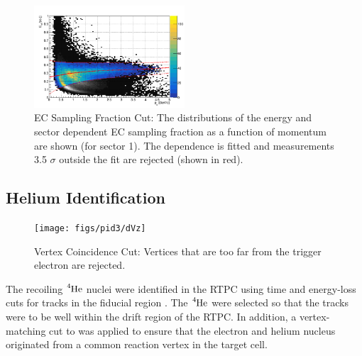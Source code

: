 \documentclass[10pt,prd,aps,showpacs,twocolumn,unsortedaddress]{revtex4-1}
\newcommand\he{{\ce{^{4}He}}}
\begin{document}
        \begin{figure}[h!]
          \centering
          \captionsetup{width=\linewidth, format=hang}
            \includegraphics[width=0.5\textwidth]{figs/pid/e/ec_SFvP.png}
            \caption[...]{EC Sampling Fraction Cut: The distributions of the energy and sector dependent EC sampling fraction as a function of momentum are shown (for sector 1). The dependence is fitted and measurements 3.5 $\sigma$ outside the fit are rejected (shown in red).} 
            \label{fig:pid:e:ec_sf}
        \end{figure}
\subsection{Helium Identification}
        \begin{figure}[h!]
          \centering
            \texttt{[image: figs/pid3/dVz]}
            \caption[...]{Vertex Coincidence Cut: Vertices that are too far from the trigger electron are rejected.} 
            \label{fig:pid:he4:dvz}
        \end{figure}
The recoiling $\he$ nuclei were identified in the RTPC using time and energy-loss cuts for tracks in the fiducial region 
. 
The $\he$ were selected so that the tracks were to be well within the drift region of the RTPC.
In addition, a vertex-matching cut to was applied to ensure that the electron and helium nucleus originated from a common reaction vertex in the target cell. 
\end{document}
